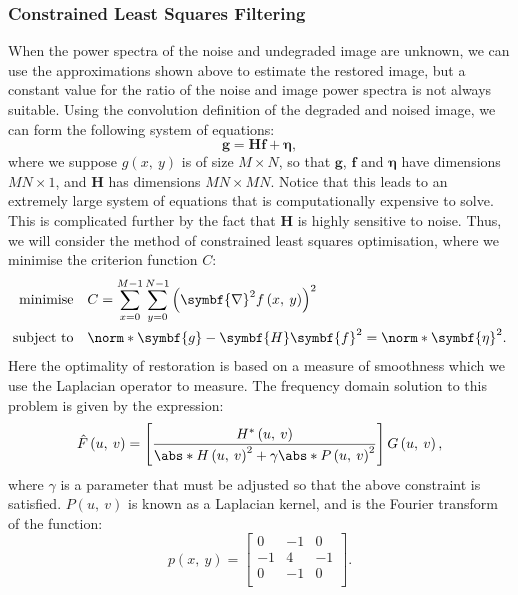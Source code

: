\documentclass{article}
\begin{document}
\subsubsection{Constrained Least Squares Filtering}
When the power spectra of the noise and undegraded image are unknown,
we can use the approximations shown above to estimate the restored
image, but a constant value for the ratio of the noise and image power
spectra is not always suitable. Using the convolution definition of the
degraded and noised image, we can form the following system of
equations:
\begin{equation*}
    \symbf{g} = \symbf{H} \symbf{f} + \symbf{\eta},
\end{equation*}
where we suppose \(g\left( x,\: y \right)\) is of size \(M \times N\),
so that \(\symbf{g}\), \(\symbf{f}\) and \(\symbf{\eta}\) have
dimensions \(MN \times 1\), and \(\symbf{H}\) has dimensions
\(MN \times MN\). Notice that this leads to an extremely large system
of equations that is computationally expensive to solve. This is
complicated further by the fact that \(\symbf{H}\) is highly sensitive
to noise. Thus, we will consider the method of constrained least squares
optimisation, where we minimise the criterion function \(C\):
\begin{align*}
    \text{minimise}   \quad & C = \sum_{x = 0}^{M - 1} \sum_{y = 0}^{N - 1} \left( \symbf{\nabla}^2 f\left( x,\: y \right) \right)^2 \\
    \text{subject to} \quad & \norm*{\symbf{g} - \symbf{H} \symbf{f}}^2 = \norm*{\symbf{\eta}}^2.
\end{align*}
Here the optimality of restoration is based on a measure of smoothness
which we use the Laplacian operator to measure. The frequency domain
solution to this problem is given by the expression:
\begin{equation*}
    \hat{F}\left( u,\: v \right) = \left[ \frac{H^\ast\left( u,\: v \right)}{\abs*{H\left( u,\: v \right)}^2 + \gamma \abs*{P\left( u,\: v \right)}^2} \right] G\left( u,\: v \right),
\end{equation*}
where \(\gamma\) is a parameter that must be adjusted so that the above
constraint is satisfied. \(P\left( u,\: v \right)\) is known as a
Laplacian kernel, and is the Fourier transform of the function:
\begin{equation*}
    p\left( x,\: y \right) =
    \begin{bmatrix}
        0  & -1 & 0  \\
        -1 & 4  & -1 \\
        0  & -1 & 0  \\
    \end{bmatrix}
    .
\end{equation*}
\end{document}
